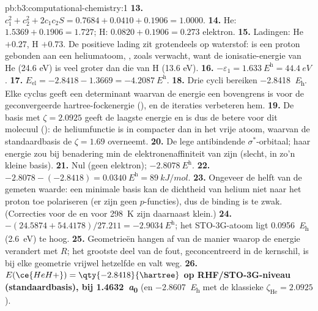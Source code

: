 \begin{solution}{pb:b3:computational-chemistry:1}
\textbf{13.} $c_1^2 + c_2^2 + 2c_1c_2S = 0.7684 + 0.0410 + 0.1906 = 1.0000$.
\textbf{14.} He: $1.5369 + 0.1906 = 1.727$; H: $0.0820 + 0.1906 = 0.273$
elektron.
\textbf{15.} Ladingen: He $+0.27$, H $+0.73$. De positieve lading zit
grotendeels op waterstof:  is een proton gebonden aan een
heliumatoom, , zoals verwacht, want de ionisatie-energie van He
(24.6 eV) is veel groter dan die van H (13.6 eV).
\textbf{16.} $-\varepsilon_1 = \qty{1.633}{\hartree} = \qty{44.4}{eV}$.
\textbf{17.} $E_{\mathrm{el}} = -2.8418 - 1.3669 = \qty{-4.2087}{\hartree}$.
\textbf{18.} Drie cycli bereiken \qty{-2.8418}{\hartree}. Elke cyclus geeft
een determinant waarvan de energie een bovengrens is voor de
geconvergeerde hartree-fockenergie (), en de iteraties
verbeteren hem.
\textbf{19.} De basis met $\zeta = 2.0925$ geeft de laagste energie en is
dus de betere voor dit molecuul (): de heliumfunctie
is in  compacter dan in het vrije atoom, waarvan de standaardbasis
de $\zeta = 1.69$ overneemt.
\textbf{20.} De lege antibindende $\sigma^*$-orbitaal; haar energie zou bij
benadering min de elektronenaffiniteit van  zijn (slecht, in zo'n
kleine basis).
\textbf{21.} Nul (geen elektron); $\qty{-2.8078}{\hartree}$.
\textbf{22.} $-2.8078 - (-2.8418) = \qty{0.0340}{\hartree} = \qty{89}{kJ/mol}$.
\textbf{23.} Ongeveer de helft van de gemeten waarde: een minimale basis
kan de dichtheid van helium niet naar het proton toe polariseren (er zijn
geen $p$-functies), dus de binding is te zwak. (Correcties voor de
 en voor \qty{298}{K} zijn daarnaast klein.)
\textbf{24.} $-(24.5874 + 54.4178)/27.211 = \qty{-2.9034}{\hartree}$; het
STO-3G-atoom ligt \qty{0.0956}{\hartree} (\qty{2.6}{eV}) te hoog.
\textbf{25.} Geometrieën hangen af van de manier waarop de energie
verandert met $R$; het grootste deel van de fout, geconcentreerd in de
kernschil, is bij elke geometrie vrijwel hetzelfde en valt weg.
\textbf{26.} \textbf{$E(\ce{HeH+}) = \qty{-2.8418}{\hartree}$ op RHF/STO-3G-niveau
(standaardbasis), bij \qty{1.4632}{\bohr}} (en \qty{-2.8607}{\hartree} met de
klassieke $\zeta_{\mathrm{He}} = 2.0925$).
\end{solution}
